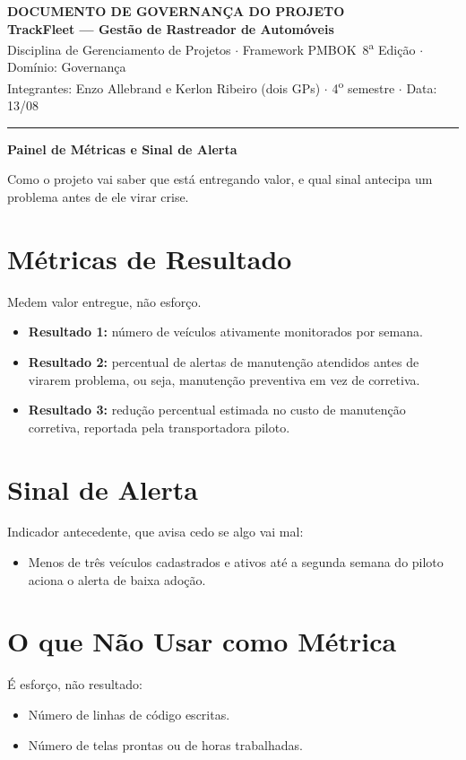 \documentclass[11pt,a4paper]{article}
\newcommand{\cabecalho}[3]{%
  \begin{center}
  {\Large\bfseries DOCUMENTO DE #1 DO PROJETO}\\[2pt]
  {\large\bfseries TrackFleet --- Gestão de Rastreador de Automóveis}\\[4pt]
  Disciplina de Gerenciamento de Projetos $\cdot$ Framework PMBOK\textregistered\ 8\textsuperscript{a} Edição $\cdot$ Domínio: #2\\[2pt]
  Integrantes: Enzo Allebrand e Kerlon Ribeiro (dois GPs) $\cdot$ 4\textsuperscript{o} semestre $\cdot$ Data: #3
  \end{center}
  \vspace{2mm}\hrule\vspace{4mm}}
\newcommand{\parte}[1]{\noindent\textbf{\large #1}\par\vspace{1mm}}
\begin{document}
\cabecalho{GOVERNANÇA}{Governança}{13/08}

\parte{Painel de Métricas e Sinal de Alerta}
\noindent Como o projeto vai saber que está entregando valor, e qual sinal antecipa um problema antes de ele virar crise.

\section{Métricas de Resultado}
Medem valor entregue, não esforço.
\begin{itemize}[itemsep=3pt]
  \item \textbf{Resultado 1:} número de veículos ativamente monitorados por semana.
  \item \textbf{Resultado 2:} percentual de alertas de manutenção atendidos antes de virarem problema, ou seja, manutenção preventiva em vez de corretiva.
  \item \textbf{Resultado 3:} redução percentual estimada no custo de manutenção corretiva, reportada pela transportadora piloto.
\end{itemize}

\section{Sinal de Alerta}
Indicador antecedente, que avisa cedo se algo vai mal:
\begin{itemize}[itemsep=3pt]
  \item Menos de três veículos cadastrados e ativos até a segunda semana do piloto aciona o alerta de baixa adoção.
\end{itemize}

\section{O que Não Usar como Métrica}
É esforço, não resultado:
\begin{itemize}[itemsep=3pt]
  \item Número de linhas de código escritas.
  \item Número de telas prontas ou de horas trabalhadas.
\end{itemize}
\end{document}
